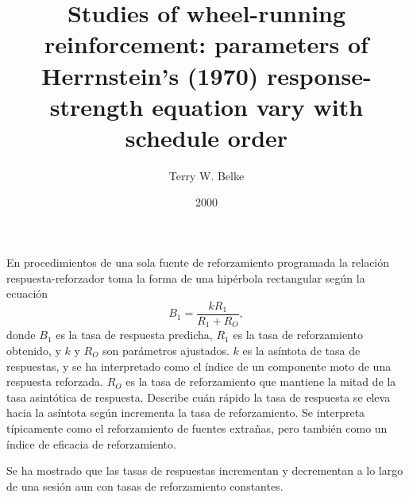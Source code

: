 \documentclass[a4paper,12pt]{article}
\title{Studies of wheel-running reinforcement: parameters of Herrnstein's (1970) response-strength equation vary with schedule order}
\author{Terry W. Belke}
\date{2000}
\begin{document}
{\scshape\bfseries \maketitle}

En procedimientos de una sola fuente de reforzamiento programada la relación respuesta-reforzador toma la forma de una hipérbola rectangular según la ecuación
\[
B_{1} = \frac{
	kR_1
}{
	R_1 + R_O
}
,\]
donde $B_1$ es la tasa de respuesta predicha, $R_1$ es la tasa de reforzamiento obtenido, y $k$ y $R_O$ son parámetros ajustados. $k$ es la asíntota de tasa de respuestas, y se ha interpretado como el índice de un componente moto de una respuesta reforzada. $R_O$ es la tasa de reforzamiento que mantiene la mitad de la tasa asintótica de respuesta. Describe cuán rápido la tasa de respuesta se eleva hacia la asíntota según incrementa la tasa de reforzamiento. Se interpreta típicamente como el reforzamiento de fuentes extrañas, pero también como un índice de eficacia de reforzamiento.

Se ha mostrado que las tasas de respuestas incrementan y decrementan a lo largo de una sesión aun con tasas de reforzamiento constantes.
\end{document}
